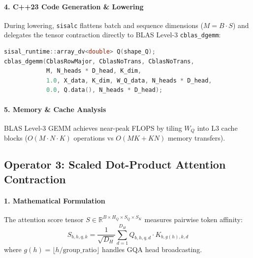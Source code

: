\paragraph{4. C++23 Code Generation \& Lowering}
During lowering, \texttt{sisalc} flattens batch and sequence dimensions ($M = B \cdot S$) and delegates the tensor contraction directly to BLAS Level-3 \texttt{cblas\_dgemm}:
\begin{lstlisting}[language=C++]
sisal_runtime::array_dv<double> Q(shape_Q);
cblas_dgemm(CblasRowMajor, CblasNoTrans, CblasNoTrans,
            M, N_heads * D_head, K_dim,
            1.0, X_data, K_dim, W_Q_data, N_heads * D_head,
            0.0, Q.data(), N_heads * D_head);
\end{lstlisting}

\paragraph{5. Memory \& Cache Analysis}
BLAS Level-3 GEMM achieves near-peak FLOPS by tiling $W_Q$ into L3 cache blocks ($O(M \cdot N \cdot K)$ operations vs $O(M K + K N)$ memory transfers).

\subsection{Operator 3: Scaled Dot-Product Attention Contraction}
\label{subsec:op_attn_contract}

\paragraph{1. Mathematical Formulation}
The attention score tensor $S \in \mathbb{R}^{B \times H_Q \times S_Q \times S_K}$ measures pairwise token affinity:
\begin{equation}
S_{b, h, q, k} = \frac{1}{\sqrt{D_H}} \sum_{d=1}^{D_H} Q_{b, h, q, d} \cdot K_{b, g(h), k, d}
\end{equation}
where $g(h) = \lfloor h / \text{group\_ratio} \rfloor$ handles GQA head broadcasting.

